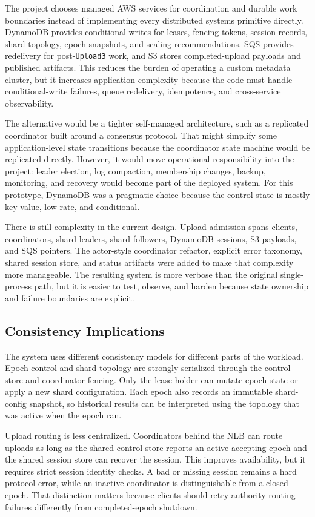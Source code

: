 \documentclass[conference]{IEEEtran}
\begin{document}
The project chooses managed AWS services for coordination and durable work boundaries instead of implementing every distributed systems primitive directly. DynamoDB provides conditional writes for leases, fencing tokens, session records, shard topology, epoch snapshots, and scaling recommendations. SQS provides redelivery for post-\texttt{Upload3} work, and S3 stores completed-upload payloads and published artifacts. This reduces the burden of operating a custom metadata cluster, but it increases application complexity because the code must handle conditional-write failures, queue redelivery, idempotence, and cross-service observability.

The alternative would be a tighter self-managed architecture, such as a replicated coordinator built around a consensus protocol. That might simplify some application-level state transitions because the coordinator state machine would be replicated directly. However, it would move operational responsibility into the project: leader election, log compaction, membership changes, backup, monitoring, and recovery would become part of the deployed system. For this prototype, DynamoDB was a pragmatic choice because the control state is mostly key-value, low-rate, and conditional.

There is still complexity in the current design. Upload admission spans clients, coordinators, shard leaders, shard followers, DynamoDB sessions, S3 payloads, and SQS pointers. The actor-style coordinator refactor, explicit error taxonomy, shared session store, and status artifacts were added to make that complexity more manageable. The resulting system is more verbose than the original single-process path, but it is easier to test, observe, and harden because state ownership and failure boundaries are explicit.

\subsection{Consistency Implications}

The system uses different consistency models for different parts of the workload. Epoch control and shard topology are strongly serialized through the control store and coordinator fencing. Only the lease holder can mutate epoch state or apply a new shard configuration. Each epoch also records an immutable shard-config snapshot, so historical results can be interpreted using the topology that was active when the epoch ran.

Upload routing is less centralized. Coordinators behind the NLB can route uploads as long as the shared control store reports an active accepting epoch and the shared session store can recover the session. This improves availability, but it requires strict session identity checks. A bad or missing session remains a hard protocol error, while an inactive coordinator is distinguishable from a closed epoch. That distinction matters because clients should retry authority-routing failures differently from completed-epoch shutdown.
\end{document}
